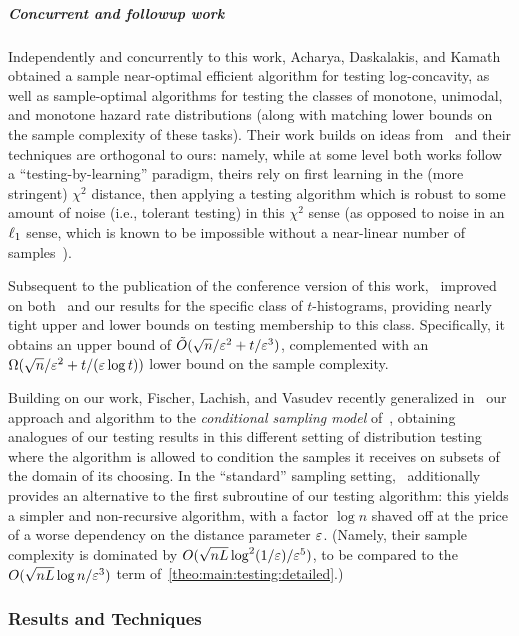 \subparagraph{Concurrent and followup work} 
Independently and concurrently to this work, Acharya, Daskalakis, and Kamath~\cite{ADK:15} obtained a sample near-optimal efficient algorithm for testing log-concavity, as well as sample-optimal algorithms for testing the classes of monotone, unimodal, and monotone hazard rate distributions (along with matching lower bounds on the sample complexity of these tasks). Their work builds on ideas from~\cite{AD:15} and their techniques are orthogonal to ours: namely, while at some level both works follow a ``testing-by-learning'' paradigm, theirs rely on first learning in the (more stringent) $\chi^2$ distance, then applying a testing algorithm which is robust to some amount of noise (i.e., tolerant testing) in this $\chi^2$ sense (as opposed to noise in an $\lp[1]$ sense, which is known to be impossible without a near-linear number of samples~\cite{ValiantValiant:10lb}).

Subsequent to the publication of the conference version of this work,~\cite{Canonne:16} improved on both~\cite{ILR:12} and our results for the specific class of $t$-histograms, providing nearly tight upper and lower bounds on testing membership to this class. Specifically, it obtains an upper bound of $\tilde{O}(\sqrt{n}/\eps^2 + t/\eps^3)$, complemented with an $\Omega(\sqrt{n}/\eps^2+t/(\eps\log t))$ lower bound on the sample complexity.

Building on our work, Fischer, Lachish, and Vasudev recently generalized in~\cite{FischerLV:16} our approach and algorithm to the \emph{conditional sampling model} of~\cite{CFGM:13,CRS:15}, obtaining analogues of our testing results in this different setting of distribution testing where the algorithm is allowed to condition the samples it receives on subsets of the domain of its choosing. In the ``standard'' sampling setting,~\cite{FischerLV:16} additionally provides an alternative to the first subroutine of our testing algorithm: this yields a simpler and non-recursive algorithm, with a factor $\log n$ shaved off at the price of a worse dependency on the distance parameter $\eps$. (Namely, their sample complexity is dominated by $O(\sqrt{nL}\log^2(1/\eps)/{\eps^5})$, to be compared to the $O(\sqrt{nL}\log n/{\eps^3})$ term of~\cref{theo:main:testing:detailed}.)

\subsubsection{Results and Techniques}


